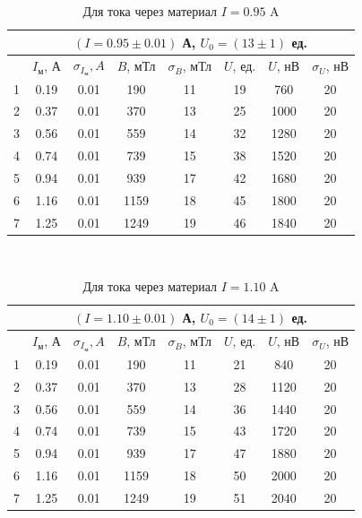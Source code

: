 \documentclass[a4paper,12pt]{article}
\theoremstyle{definition}
\begin{document}
    \begin{table}[H]
      \centering
      \caption{Для тока через материал $I = 0.95$ A}
      \label{tabular:med6}
        \begin{tabular}{|c|c|c|c|c|c|c|c|} \hline
            & \multicolumn{7}{c|}{$(I = 0.95 \pm 0.01)$ А, \qquad $U_0 = (13 \pm 1)$ ед.} \\ \hline
            & $I_{\text{м}}$, А & $\sigma_{I_{\text{м}}}, A$ & $B$, мТл & $\sigma_B$, мТл & $U$, ед. & $U$, нВ & $\sigma_{U}$, нВ \\ \hline
          1 & 0.19 & 0.01 &  190 & 11 & 19 & 760 & 20 \\ \hline
          2 & 0.37 & 0.01 &  370 & 13 & 25 & 1000 & 20 \\ \hline
          3 & 0.56 & 0.01 &  559 & 14 & 32 & 1280 & 20 \\ \hline
          4 & 0.74 & 0.01 &  739 & 15 & 38 & 1520 & 20 \\ \hline
          5 & 0.94 & 0.01 &  939 & 17 & 42 & 1680 & 20 \\ \hline
          6 & 1.16 & 0.01 & 1159 & 18 & 45 & 1800 & 20 \\ \hline
          7 & 1.25 & 0.01 & 1249 & 19 & 46 & 1840 & 20 \\ \hline
        \end{tabular}\\
    \end{table}

    \begin{table}[H]
      \centering
      \caption{Для тока через материал $I = 1.10$ A}
      \label{tabular:med7}
        \begin{tabular}{|c|c|c|c|c|c|c|c|} \hline
            & \multicolumn{7}{c|}{$(I = 1.10 \pm 0.01)$ А, \qquad $U_0 = (14 \pm 1)$ ед.} \\ \hline
            & $I_{\text{м}}$, А & $\sigma_{I_{\text{м}}}, A$ & $B$, мТл & $\sigma_B$, мТл & $U$, ед. & $U$, нВ & $\sigma_{U}$, нВ \\ \hline
          1 & 0.19 & 0.01 &  190 & 11 & 21 & 840 & 20 \\ \hline
          2 & 0.37 & 0.01 &  370 & 13 & 28 & 1120 & 20 \\ \hline
          3 & 0.56 & 0.01 &  559 & 14 & 36 & 1440 & 20 \\ \hline
          4 & 0.74 & 0.01 &  739 & 15 & 43 & 1720 & 20 \\ \hline
          5 & 0.94 & 0.01 &  939 & 17 & 47 & 1880 & 20 \\ \hline
          6 & 1.16 & 0.01 & 1159 & 18 & 50 & 2000 & 20 \\ \hline
          7 & 1.25 & 0.01 & 1249 & 19 & 51 & 2040 & 20 \\ \hline
        \end{tabular}\\
    \end{table}
\end{document}
